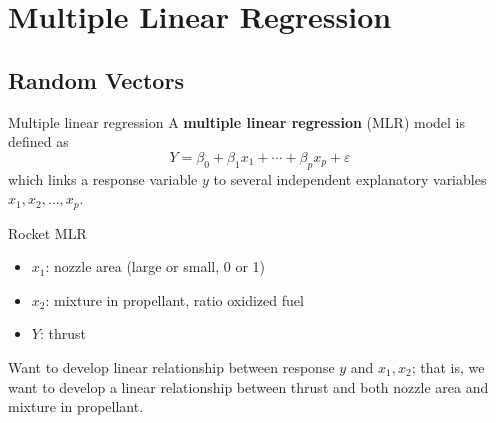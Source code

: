 \chapter{Multiple Linear Regression}
\section{Random Vectors}
\begin{Definition}{Multiple linear regression}{}
    A \textbf{multiple linear regression} (MLR) model is defined as
    \[ Y=\beta_0+\beta_1 x_1+\cdots+\beta_p x_p+\varepsilon \]
    which links a response variable $ y $ to several
    independent explanatory variables $ x_1,x_2,\ldots,x_p $.
\end{Definition}
\begin{Example}{Rocket MLR}{}
    \begin{itemize}
        \item $ x_1 $: nozzle area (large or small, 0 or 1)
        \item $ x_2 $: mixture in propellant, ratio oxidized fuel
        \item $ Y $: thrust
    \end{itemize}
    Want to develop linear relationship between response $ y $
    and $ x_1,x_2 $; that is, we want to develop a linear relationship
    between thrust and both nozzle area and mixture in propellant.
\end{Example}

